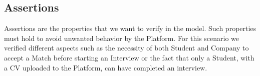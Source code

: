 \subsection{Assertions}
Assertions are the properties that we want to verify in the model. Such properties must hold to avoid unwanted behavior by the Platform. For this scenario we verified different aspects such as the necessity of both Student and Company to accept a Match before starting an Interview or the fact that only a Student, with a CV uploaded to the Platform, can have completed an interview.

